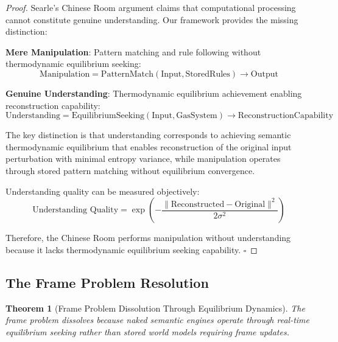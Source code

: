 \documentclass[11pt,a4paper]{article}
\newtheorem{theorem}{Theorem}[section]
\begin{document}
\begin{proof}
Searle's Chinese Room argument claims that computational processing cannot constitute genuine understanding. Our framework provides the missing distinction:

\textbf{Mere Manipulation}: Pattern matching and rule following without thermodynamic equilibrium seeking:
\begin{equation}
\text{Manipulation} = \text{PatternMatch}(\text{Input}, \text{StoredRules}) \to \text{Output}
\end{equation}

\textbf{Genuine Understanding}: Thermodynamic equilibrium achievement enabling reconstruction capability:
\begin{equation}
\text{Understanding} = \text{EquilibriumSeeking}(\text{Input}, \text{GasSystem}) \to \text{ReconstructionCapability}
\end{equation}

The key distinction is that understanding corresponds to achieving semantic thermodynamic equilibrium that enables reconstruction of the original input perturbation with minimal entropy variance, while manipulation operates through stored pattern matching without equilibrium convergence.

Understanding quality can be measured objectively:
\begin{equation}
\text{Understanding Quality} = \exp\left(-\frac{\|\text{Reconstructed} - \text{Original}\|^2}{2\sigma^2}\right)
\end{equation}

Therefore, the Chinese Room performs manipulation without understanding because it lacks thermodynamic equilibrium seeking capability. $\square$
\end{proof}

\subsection{The Frame Problem Resolution}

\begin{theorem}[Frame Problem Dissolution Through Equilibrium Dynamics]
The frame problem dissolves because naked semantic engines operate through real-time equilibrium seeking rather than stored world models requiring frame updates.
\end{theorem}
\end{document}
